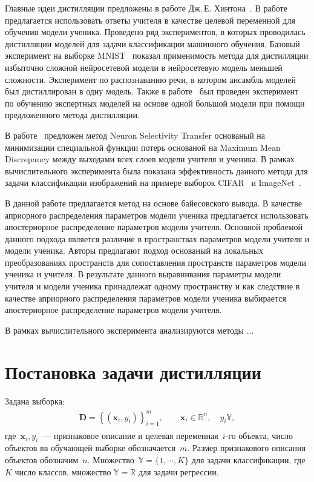 \documentclass[12pt]{a&t}
\begin{document}
Главные идеи дистилляции предложены в работе Дж.\,Е. Хинтона~\cite{Hinton2015}. В работе предлагается использовать ответы учителя в качестве целевой переменной для обучения модели ученика. Проведено ряд экспериментов, в которых проводилась дистилляции моделей для задачи классификации машинного обучения. Базовый эксперимент на выборке MNIST~\cite{mnist} показал применимость метода для дистилляции избыточно сложной нейросетевой модели в нейросетевую модель меньшей сложности. Эксперимент по распознаванию речи, в котором ансамбль моделей был дистиллирован в одну модель. Также в работе~\cite{Hinton2015} был проведен эксперимент по обучению экспертных моделей на основе одной большой модели при помощи предложенного метода дистилляции.

В работе~\cite{Zehao2017} предложен метод Neuron Selectivity Transfer основаный на минимизации специальной функции потерь основаной на Maximum Mean Discrepancy между выходами всех слоев модели учителя и ученика. В рамках вычислительного эксперимента была показана эффективность данного метода для задачи классификации изображений на примере выборок CIFAR~\cite{cifar10} и ImageNet~\cite{imagenet}.

В данной работе предлагается метод на основе байесовского вывода. В качестве априорного распределения параметров модели ученика предлагается использовать апостериорное распределение параметров модели учителя. Основной проблемой данного подхода является различие в пространствах параметров модели учителя и модели ученика. Авторы предлагают подход основаный на локальных преобразованиях пространств для сопоставления пространств параметров модели ученика и учителя. В результате данного выравнивания параметры модели учителя и модели ученика принадлежат одному пространству и как следствие в качестве априорного распределения параметров модели ученика выбирается апостериорное распределение параметров модели учителя.

В рамках вычислительного эксперимента анализируются методы ...

\section{Постановка задачи дистилляции}
Задана выборка:
\begin{gather}
\label{eq:st:1}
\begin{aligned}
\mathbf{D} = \left\{\left(\mathbf{x}_i, y_i\right)\right\}_{i=1}^{m}, \qquad \mathbf{x}_i \in \mathbb{R}^{n}, \quad y_i \mathbb{Y},
\end{aligned}
\end{gather}
где~$\mathbf{x}_i, y_i$~--- признаковое описание и целевая переменная~$i$-го объекта, число объектов вв обучающей выборке обозначается~$m$. Размер признакового описания объектов обозначим~$n$. Множество~$\mathbb{Y}=\{1,\cdots,K\}$ для задачи классификации, где~$K$ число классов, множество $\mathbb{Y}=\mathbb{R}$ для задачи регрессии.
\end{document}
